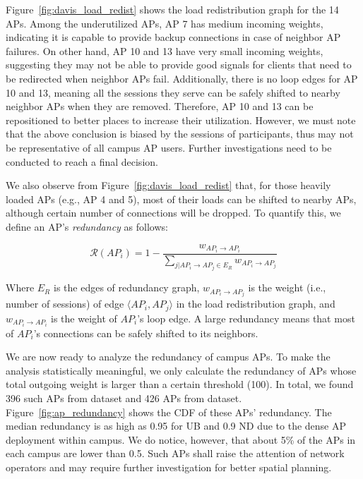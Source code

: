 Figure~\ref{fig:davis_load_redist} shows the load redistribution graph for the
14 APs. Among the underutilized APs, AP 7 has medium 
incoming weights, indicating it is capable to provide backup connections
in case of neighbor AP failures. On other hand, AP 10 and 13 have very small incoming
weights, suggesting they may not be able to provide good signals for clients
that need to be redirected when neighbor APs fail. Additionally, there is no loop edges for
AP 10 and 13, meaning all the \wifi{} sessions they serve can be safely shifted to
nearby neighbor APs when they are removed. Therefore, AP 10 and 13 can be
repositioned to better places to increase their utilization. However, we must
note that the above conclusion is biased by the \wifi{} sessions of \PhoneLab{}
participants, thus may not be representative of all campus AP users. Further
investigations need to be conducted to reach a final decision.

\begin{figure}[t]
  \vspace*{\aftercaptiongap}
\end{figure}

We also observe from Figure~\ref{fig:davis_load_redist} that, for those heavily
loaded APs (e.g., AP 4 and 5), most of their loads can be shifted to nearby APs,
although certain number of connections will be dropped. To quantify this, we define an
AP's \textit{redundancy} as follows:

\begin{equation}
  \mathcal{R}(AP_i) = 1 - \frac{w_{AP_i \rightarrow AP_i}}{\sum_{j|AP_i \rightarrow
    AP_j \in E_R} w_{AP_i \rightarrow AP_j}}
\end{equation}

Where $E_R$ is the edges of redundancy graph, $w_{AP_i \rightarrow AP_j}$ is the weight (i.e., number of sessions)
of edge $\langle AP_i, AP_j\rangle$ in the load redistribution graph, and
$w_{AP_i \rightarrow AP_i}$ is the weight of $AP_i$'s loop edge. A large
redundancy means that most of $AP_i$'s connections can be safely shifted to its
neighbors.

We are now ready to analyze the redundancy of campus APs. To make the analysis
statistically meaningful, we only calculate the redundancy of APs whose total
outgoing weight is larger than a certain threshold (100). In total, we found
396 such APs from \ubscan{} dataset and 426 APs from \ndscan{} dataset.
Figure~\ref{fig:ap_redundancy} shows the CDF of these APs' redundancy. The
median redundancy is as high as 0.95 for UB and 0.9 ND due to the dense AP
deployment within campus. We do notice, however, that about 5\% of the APs in
each campus are lower than 0.5. Such APs shall raise the attention of network
operators and may require further investigation for better spatial planning.


